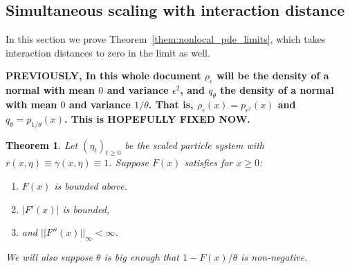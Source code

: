 \documentclass[12pt]{article}
\newtheorem{theorem}{Theorem}[section]
\begin{document}
\subsection{Simultaneous scaling with interaction distance}

In this section we prove Theorem~\ref{them:nonlocal_pde_limits},
which takes interaction distances to zero in the limit as well.

\textbf{PREVIOUSLY, In this whole document $\rho_\epsilon$ will be the density of a normal with mean $0$ and variance $\epsilon^2$, and $q_\theta$ the density of a normal with mean $0$ and variance $1/\theta$. That is, $\rho_\epsilon(x) = p_{\epsilon^2}(x)$ and $q_\theta = p_{1/\theta}(x)$. This is HOPEFULLY FIXED NOW.}

\begin{theorem} \label{TeoremOneStepConvergence}
    Let $(\eta_t)_{t \geq 0}$ be the scaled particle system with $r(x, \eta) \equiv \gamma(x, \eta) \equiv 1$.
    Suppose $F(x)$ satisfies for $x \ge 0$:
    \begin{enumerate}
        \item $F(x)$  is bounded above.
        \item $|F'(x)|$ is bounded,
        \item and $||F''(x)||_\infty < \infty$.
    \end{enumerate}
    We will also suppose $\theta$ is big enough that $1- F(x)/\theta$ is non-negative.


\end{theorem}
\end{document}
